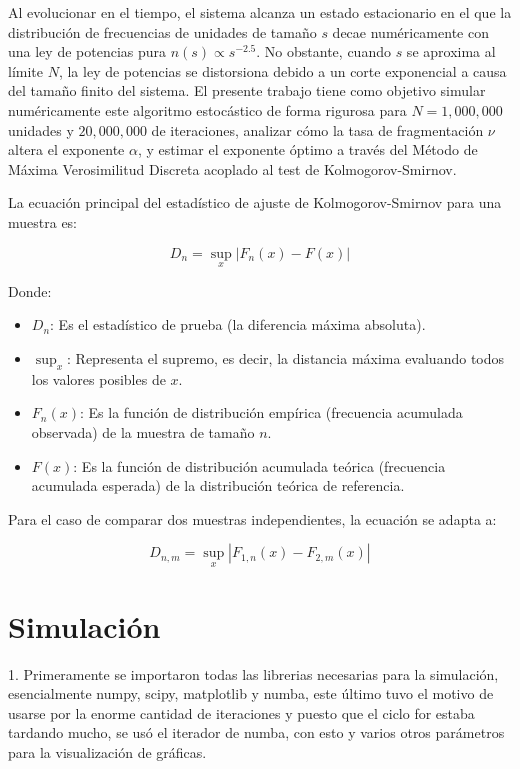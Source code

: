\documentclass[twoside, a4paper, 12pt, spanish]{article}
\begin{document}
Al evolucionar en el tiempo, el sistema alcanza un estado estacionario en el que la distribución de frecuencias de unidades de tamaño $s$ decae numéricamente con una ley de potencias pura $n(s) \propto s^{-2.5}$. No obstante, cuando $s$ se aproxima al límite $N$, la ley de potencias se distorsiona debido a un corte exponencial a causa del tamaño finito del sistema. El presente trabajo tiene como objetivo simular numéricamente este algoritmo estocástico de forma rigurosa para $N = 1,000,000$ unidades y $20,000,000$ de iteraciones, analizar cómo la tasa de fragmentación $\nu$ altera el exponente $\alpha$, y estimar el exponente óptimo a través del Método de Máxima Verosimilitud Discreta acoplado al test de Kolmogorov-Smirnov.

La ecuación principal del estadístico de ajuste de Kolmogorov-Smirnov para una muestra es:

\[
D_n = \sup_x |F_n(x) - F(x)|
\]

Donde:
\begin{itemize}
    \item $D_n$: Es el estadístico de prueba (la diferencia máxima absoluta).
    \item $\sup_x$: Representa el supremo, es decir, la distancia máxima evaluando todos los valores posibles de $x$.
    \item $F_n(x)$: Es la función de distribución empírica (frecuencia acumulada observada) de la muestra de tamaño $n$.
    \item $F(x)$: Es la función de distribución acumulada teórica (frecuencia acumulada esperada) de la distribución teórica de referencia.
\end{itemize}

Para el caso de comparar dos muestras independientes, la ecuación se adapta a:

\[
D_{n,m} = \sup_x |F_{1,n}(x) - F_{2,m}(x)|
\]


\section{Simulación}

1. Primeramente se importaron todas las librerias necesarias para la simulación, esencialmente numpy, scipy, matplotlib y numba, este último tuvo el motivo de usarse por la enorme cantidad de iteraciones y puesto que el ciclo for estaba tardando mucho, se usó el iterador de numba, con esto y varios otros parámetros para la visualización de gráficas.
\end{document}
